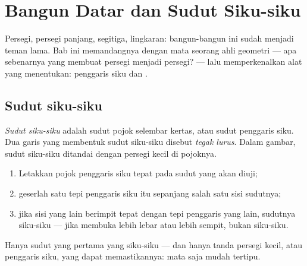 \chapter{Bangun Datar dan Sudut Siku-siku}\label{ch:g3:shapes}

Persegi, persegi panjang, segitiga, lingkaran: bangun-bangun ini
sudah menjadi teman lama. Bab ini memandangnya dengan mata seorang
ahli geometri --- apa sebenarnya yang membuat persegi menjadi
persegi? --- lalu memperkenalkan alat yang menentukan: penggaris
siku dan .

\section{Sudut siku-siku}

\begin{definition}\label{def:g3:shapes:rightangle}
\emph{Sudut siku-siku} adalah sudut pojok
selembar kertas, atau sudut penggaris siku. Dua garis yang membentuk
sudut siku-siku disebut \emph{tegak lurus}. Dalam gambar, sudut
siku-siku ditandai dengan persegi kecil di pojoknya.
\end{definition}

\begin{method}\label{met:g3:shapes:check}
\begin{enumerate}
  \item Letakkan pojok penggaris siku tepat pada sudut yang akan
        diuji;
  \item geserlah satu tepi penggaris siku itu sepanjang salah satu
        sisi sudutnya;
  \item jika sisi yang lain berimpit tepat dengan tepi penggaris
        yang lain, sudutnya siku-siku --- jika membuka lebih lebar
        atau lebih sempit, bukan siku-siku.
\end{enumerate}
\end{method}

\begin{omfigure}

{\small Hanya sudut yang pertama yang siku-siku --- dan hanya tanda
persegi kecil, atau penggaris siku, yang dapat memastikannya: mata
saja mudah tertipu.}
\end{omfigure}

